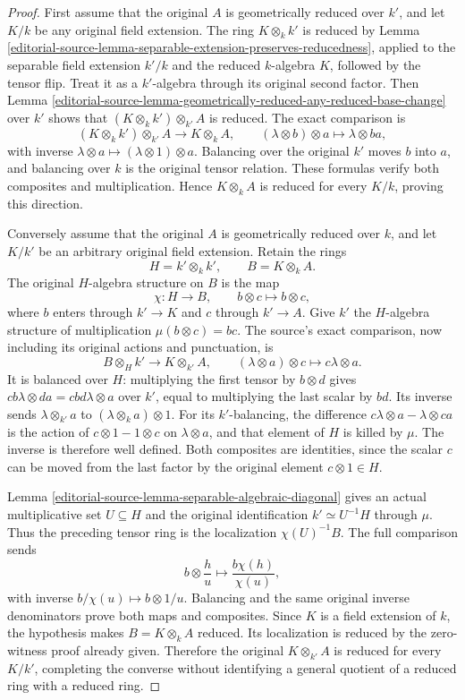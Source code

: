 \begin{proof}
First assume that the original $A$ is geometrically
reduced over $k'$, and let $K/k$ be any original
field extension. The ring $K\otimes_kk'$ is
reduced by
Lemma \ref{editorial-source-lemma-separable-extension-preserves-reducedness},
applied to the separable field extension $k'/k$
and the reduced $k$-algebra $K$, followed by
the tensor flip. Treat it as a $k'$-algebra
through its original second factor. Then
Lemma \ref{editorial-source-lemma-geometrically-reduced-any-reduced-base-change}
over $k'$ shows that
$(K\otimes_kk')\otimes_{k'}A$ is reduced.
The exact comparison is
$$
(K\otimes_kk')\otimes_{k'}A\longrightarrow K\otimes_kA,
\qquad (\lambda\otimes b)\otimes a\longmapsto\lambda\otimes ba,
$$
with inverse $\lambda\otimes a\mapsto
(\lambda\otimes1)\otimes a$.
Balancing over the original $k'$ moves $b$
into $a$, and balancing over $k$ is the
original tensor relation. These formulas
verify both composites and multiplication.
Hence $K\otimes_kA$ is reduced for every
$K/k$, proving this direction.

Conversely assume that the original $A$ is
geometrically reduced over $k$, and let $K/k'$
be an arbitrary original field extension.
Retain the rings
$$
H=k'\otimes_kk',\qquad B=K\otimes_kA.
$$
The original $H$-algebra structure on $B$
is the map
$$
\chi:H\longrightarrow B,\qquad
b\otimes c\longmapsto b\otimes c,
$$
where $b$ enters through $k'\to K$ and
$c$ through $k'\to A$. Give $k'$ the
$H$-algebra structure of multiplication
$\mu(b\otimes c)=bc$.
The source's exact comparison, now including
its original actions and punctuation, is
$$
B\otimes_Hk'\longrightarrow K\otimes_{k'}A,
\qquad (\lambda\otimes a)\otimes c
\longmapsto c\lambda\otimes a.
$$
It is balanced over $H$: multiplying the
first tensor by $b\otimes d$ gives
$cb\lambda\otimes da= cbd\lambda\otimes a$
over $k'$, equal to multiplying the last
scalar by $bd$. Its inverse sends
$\lambda\otimes_{k'}a$ to
$(\lambda\otimes_ka)\otimes1$.
For its $k'$-balancing, the difference
$c\lambda\otimes a-\lambda\otimes ca$
is the action of $c\otimes1-1\otimes c$
on $\lambda\otimes a$, and that element
of $H$ is killed by $\mu$. The inverse
is therefore well defined. Both composites
are identities, since the scalar $c$ can
be moved from the last factor by the
original element $c\otimes1\in H$.

Lemma \ref{editorial-source-lemma-separable-algebraic-diagonal}
gives an actual multiplicative set $U\subseteq H$
and the original identification $k'\simeq U^{-1}H$
through $\mu$. Thus the preceding tensor
ring is the localization $\chi(U)^{-1}B$.
The full comparison sends
$$
b\otimes\frac hu\longmapsto
\frac{b\chi(h)}{\chi(u)},
$$
with inverse $b/\chi(u)\mapsto b\otimes1/u$.
Balancing and the same original inverse
denominators prove both maps and composites.
Since $K$ is a field extension of $k$,
the hypothesis makes $B=K\otimes_kA$
reduced. Its localization is reduced by
the zero-witness proof already given.
Therefore the original $K\otimes_{k'}A$
is reduced for every $K/k'$, completing
the converse without identifying a general
quotient of a reduced ring with a reduced ring.


\end{proof}
